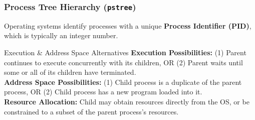\documentclass[10pt,a4paper]{article}
\begin{document}
\subsubsection*{Process Tree Hierarchy (\texttt{pstree})}
Operating systems identify processes with a unique \textbf{Process Identifier (PID)}, which is typically an integer number.

\begin{center}
\end{center}

\begin{conceptcard}{Execution \& Address Space Alternatives}
\textbf{Execution Possibilities:} (1) Parent continues to execute concurrently with its children, OR (2) Parent waits until some or all of its children have terminated.\\
\textbf{Address Space Possibilities:} (1) Child process is a duplicate of the parent process, OR (2) Child process has a new program loaded into it.\\
\textbf{Resource Allocation:} Child may obtain resources directly from the OS, or be constrained to a subset of the parent process's resources.
\end{conceptcard}
\end{document}
